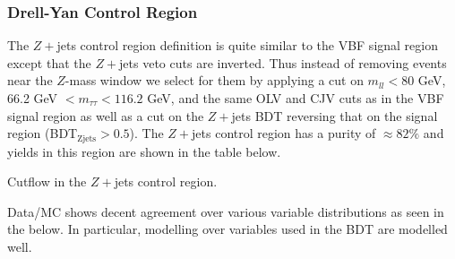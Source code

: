 \subsubsection{Drell-Yan Control Region}

The $Z+$jets control region definition is quite similar to the VBF signal region except that the $Z+$jets veto cuts are inverted. Thus instead of removing events near the $Z$-mass window we select for them by applying a cut on $m_{ll}<80$ GeV,  66.2 GeV $< m_{\tau\tau}< 116.2$ GeV, and the same OLV and CJV cuts as in the VBF signal region as well as a cut on the $Z+$jets BDT reversing that on the signal region (BDT$_\text{Zjets}>0.5$). The $Z+$jets control region has a purity of $\approx 82\%$ and yields in this region are shown in the table below.

\begin{table}[h!]
\scalebox{0.4}{

}
\caption{Cutflow in the $Z+$jets control region.}
\label{tab:zttcr}
\end{table}

Data/MC shows decent agreement over various variable distributions as seen in the  below. In particular, modelling over variables used in the BDT are modelled well. 

